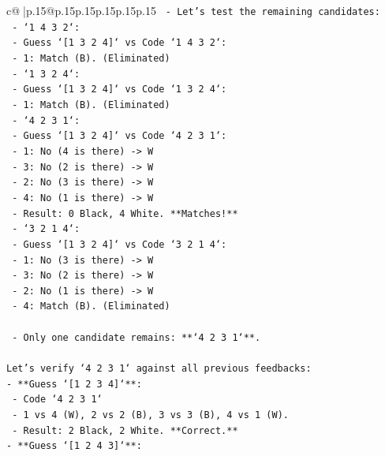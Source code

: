 \documentclass{article}
\begin{document}
{\begin{supertabular}{c@{$\;$}|p{.15\linewidth}@{}p{.15\linewidth}p{.15\linewidth}p{.15\linewidth}p{.15\linewidth}p{.15\linewidth}}
{{{\texttt{    {-} Let's test the remaining candidates:} \\
\texttt{        {-} `1 4 3 2`:} \\
\texttt{          {-} Guess `{[}1 3 2 4{]}` vs Code `1 4 3 2`:} \\
\texttt{            {-} 1: Match (B). (Eliminated)} \\
\texttt{        {-} `1 3 2 4`:} \\
\texttt{          {-} Guess `{[}1 3 2 4{]}` vs Code `1 3 2 4`:} \\
\texttt{            {-} 1: Match (B). (Eliminated)} \\
\texttt{        {-} `4 2 3 1`:} \\
\texttt{          {-} Guess `{[}1 3 2 4{]}` vs Code `4 2 3 1`:} \\
\texttt{            {-} 1: No (4 is there) {-}> W} \\
\texttt{            {-} 3: No (2 is there) {-}> W} \\
\texttt{            {-} 2: No (3 is there) {-}> W} \\
\texttt{            {-} 4: No (1 is there) {-}> W} \\
\texttt{            {-} Result: 0 Black, 4 White. **Matches!**} \\
\texttt{        {-} `3 2 1 4`:} \\
\texttt{          {-} Guess `{[}1 3 2 4{]}` vs Code `3 2 1 4`:} \\
\texttt{            {-} 1: No (3 is there) {-}> W} \\
\texttt{            {-} 3: No (2 is there) {-}> W} \\
\texttt{            {-} 2: No (1 is there) {-}> W} \\
\texttt{            {-} 4: Match (B). (Eliminated)} \\
\\ 
\texttt{    {-} Only one candidate remains: **`4 2 3 1`**.} \\
\\ 
\texttt{Let's verify `4 2 3 1` against all previous feedbacks:} \\
\texttt{{-} **Guess `{[}1 2 3 4{]}`**:} \\
\texttt{  {-} Code `4 2 3 1`} \\
\texttt{  {-} 1 vs 4 (W), 2 vs 2 (B), 3 vs 3 (B), 4 vs 1 (W).} \\
\texttt{  {-} Result: 2 Black, 2 White. **Correct.**} \\
\texttt{{-} **Guess `{[}1 2 4 3{]}`**:} \\
}}}
\end{supertabular}}
\end{document}
